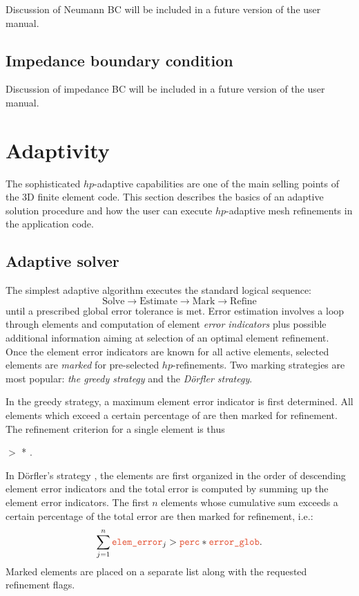 Discussion of Neumann BC will be included in a future version of the user manual.

\subsection{Impedance boundary condition}
\label{sec:impedance}

Discussion of impedance BC will be included in a future version of the user manual.

\section{Adaptivity}
\label{sec:adaptivity}

The sophisticated $hp$-adaptive capabilities are one of the main selling points of the \hp3D finite element code. This section describes the basics of an adaptive solution procedure and how the user can execute $hp$-adaptive mesh refinements in the application code.

\subsection{Adaptive solver}
\label{sec:adaptive-solver}

The simplest adaptive algorithm executes the standard logical sequence:
\[
	\text{Solve} \longrightarrow
	\text{Estimate} \longrightarrow
	\text{Mark} \longrightarrow
	\text{Refine} 
\]
until a prescribed global error tolerance is met. Error estimation involves a loop through elements and computation of element {\em error indicators} plus possible additional information aiming at selection of an optimal element refinement. Once the element error indicators are known for all active elements, selected elements are {\em marked} for pre-selected $hp$-refinements. Two marking strategies are most popular: {\em the greedy strategy} and the {\em D\"orfler strategy}. 

In the greedy strategy, a maximum element error indicator  is first determined. All elements which exceed a certain percentage of  are then marked for refinement. The refinement criterion for a single element is thus
\begin{center}
	 $>$  .
\end{center}

In D\"orfler's strategy \cite{dorfler1996marking}, the elements are first organized in the order of descending element error indicators and the total error  is computed by summing up the element error indicators. The first $n$ elements whose cumulative sum exceeds a certain percentage of the total error are then marked for refinement, i.e.:
\[
	\sum_{j=1}^n \var{elem\_error}_j > \var{perc} * \var{error\_glob} .
\]
Marked elements are placed on a separate list along with the requested refinement flags.

